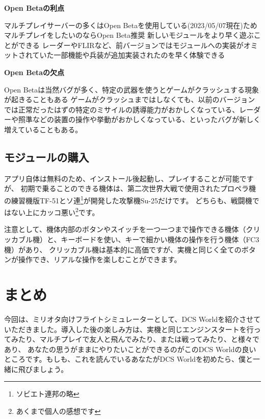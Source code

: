 \textbf{Open Betaの利点}


マルチプレイサーバーの多くはOpen Betaを使用している(2023/05/07現在)ためマルチプレイをしたいのならOpen Beta推奨
新しいモジュールをより早く遊ぶことができる
レーダーやFLIRなど、前バージョンではモジュールへの実装がオミットされていた一部機能や兵装が追加実装されたのを早く体験できる


\textbf{Open Betaの欠点}


Open Betaは当然バグが多く、特定の武器を使うとゲームがクラッシュする現象が起きることもある
ゲームがクラッシュまではしなくても、以前のバージョンでは正常だったはずの特定のミサイルの誘導能力がおかしくなっている、レーダーや照準などの装置の操作や挙動がおかしくなっている、といったバグが新しく増えていることもある。

\subsection{モジュールの購入}
アプリ自体は無料のため、インストール後起動し、プレイすることが可能ですが、
初期で乗ることのできる機体は、第二次世界大戦で使用されたプロペラ機の練習機版TF-51とソ連\footnote{ソビエト連邦の略}が開発した攻撃機Su-25だけです。
どちらも、戦闘機ではない上にカッコ悪い\footnote{あくまで個人の感想です}です。


注意として、機体内部のボタンやスイッチを一つ一つまで操作できる機体（クリッカブル機）と、キーボードを使い、キーで細かい機体の操作を行う機体（FC3機）があり、
クリッカブル機は基本的に高価ですが、実機と同じく全てのボタンが操作でき、リアルな操作を楽しむことができます。

\section{まとめ}
今回は、ミリオタ向けフライトシミュレーターとして、DCS Worldを紹介させていただきました。導入した後の楽しみ方は、実機と同じエンジンスタートを行ってみたり、マルチプレイで友人と飛んでみたり、または戦ってみたり、と様々であり、
あなたの思うがままにやりたいことができるのがこのDCS Worldの良いところです。もしも、これを読んでいるあなたがDCS Worldを初めたら、僕と一緒に飛びましょう。